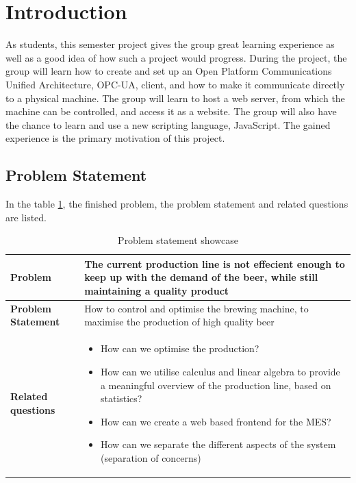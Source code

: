 \section{Introduction}

As students, this semester project gives the group great learning experience as
well as a good idea of how such a project would progress. During the project,
the group will learn how to create and set up an Open Platform Communications
Unified Architecture, OPC-UA, client, and how to make it communicate directly
to a physical machine. The group will learn to host a web server, from which the
machine can be controlled, and access it as a website. The group will also have
the chance to learn and use a new scripting language, JavaScript. The gained
experience is the primary motivation of this project.

\subsection{Problem Statement}
In the table \ref{table:problem-statement-report}, the finished problem, the problem statement and related questions are listed.
\begin{table}[ht]
    \begin{tabularx}{\textwidth}{|>{\RaggedRight}p{4cm}|>{\RaggedRight}X|}
        \hline
        \textbf{Problem} & The current production line is not effecient enough to keep up with the demand of the beer, while still maintaining a quality product\\
        \hline
        \textbf{Problem Statement} & How to control and optimise the brewing machine, to maximise the production of high quality beer\\
        \hline
        \textbf{Related questions} & 
            \begin{itemize}
                \item How can we optimise the production?
                \item How can we utilise calculus and linear algebra to provide a meaningful overview of the production line, based on statistics?
                \item How can we create a web based frontend for the MES?
                \item How can we separate the different aspects of the system (separation of concerns)
            \end{itemize} \\
            \hline
    \end{tabularx}
    \caption{Problem statement showcase} 
    \label{table:problem-statement-report}
\end{table} 

